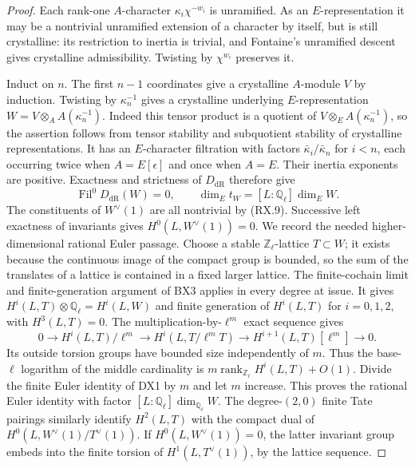 \begin{proof}
Each rank-one $A$-character $\kappa_i\chi^{-w_i}$ is unramified.
As an $E$-representation it may be a nontrivial unramified extension
of a character by itself, but is still crystalline: its restriction
to inertia is trivial, and Fontaine's unramified descent
\cite[\S5.1.5]{RX-Fontaine} gives crystalline admissibility.
Twisting by $\chi^{w_i}$ preserves it.

Induct on $n$.  The first $n-1$ coordinates give a crystalline
$A$-module $V$ by induction.  Twisting by $\kappa_n^{-1}$ gives a
crystalline underlying $E$-representation
$W=V\otimes_A A(\kappa_n^{-1})$.
Indeed this tensor product is a quotient of
$V\otimes_E A(\kappa_n^{-1})$, so the assertion follows from
tensor stability and subquotient stability of crystalline representations.
It has an $E$-character filtration with factors
$\bar\kappa_i/\bar\kappa_n$ for $i<n$, each occurring twice when
$A=E[\epsilon]$ and once when $A=E$.
Their inertia exponents are positive.  Exactness and strictness of
$D_{\mathrm{dR}}$ therefore give
\[
 \operatorname{Fil}^0D_{\mathrm{dR}}(W)=0,
 \qquad \dim_E t_W=[L:\mathbb Q_\ell]\dim_E W.
 \tag{RX.10}
\]
The constituents of $W^\vee(1)$ are all nontrivial by (RX.9).
Successive left exactness of invariants gives $H^0(L,W^\vee(1))=0$.
We record the needed higher-dimensional rational Euler passage.
Choose a stable $\mathbb Z_\ell$-lattice $T\subset W$; it exists
because the continuous image of the compact group is bounded, so
the sum of the translates of a lattice is contained in a fixed
larger lattice.  The finite-cochain limit and finite-generation
argument of BX3 applies in every degree at issue.  It gives
$H^i(L,T)\otimes\mathbb Q_\ell=H^i(L,W)$ and finite generation
of $H^i(L,T)$ for $i=0,1,2$, with $H^3(L,T)=0$.
The multiplication-by-$\ell^m$ exact sequence gives
\[
 0\longrightarrow H^i(L,T)/\ell^m
 \longrightarrow H^i(L,T/\ell^mT)
 \longrightarrow H^{i+1}(L,T)[\ell^m]\longrightarrow0.
\]
Its outside torsion groups have bounded size independently of $m$.
Thus the base-$\ell$ logarithm of the middle cardinality is
$m\operatorname{rank}_{\mathbb Z_\ell}H^i(L,T)+O(1)$.
Divide the finite Euler identity of DX1 by $m$ and let $m$ increase.
This proves the rational Euler identity with factor
$[L:\mathbb Q_\ell]\dim_{\mathbb Q_\ell}W$.
The degree-$(2,0)$ finite Tate pairings similarly identify
$H^2(L,T)$ with the compact dual of $H^0(L,W^\vee(1)/T^\vee(1))$.
If $H^0(L,W^\vee(1))=0$, the latter invariant group embeds into
the finite torsion of $H^1(L,T^\vee(1))$, by the lattice sequence.

\end{proof}
